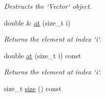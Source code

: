 \begin{DoxyCompactItemize}
\begin{DoxyCompactList}\small\item\em Destructs the `Vector` object. \item\end{DoxyCompactList}\item 
double \& \hyperlink{classcs1730_1_1Vector_ac6a29c2fc7cf67d333483ba396b96323}{at} (size\_\-t i)
\begin{DoxyCompactList}\small\item\em Returns the element at index `i`. \item\end{DoxyCompactList}\item 
double \hyperlink{classcs1730_1_1Vector_a1191a55feadaff0f2e31e504182790c0}{at} (size\_\-t i) const 
\begin{DoxyCompactList}\small\item\em Returns the element at index `i`. \item\end{DoxyCompactList}\item 
\hypertarget{classcs1730_1_1Vector_a316edd0365ccd2adeedb5d177d274305}{
size\_\-t \hyperlink{classcs1730_1_1Vector_a316edd0365ccd2adeedb5d177d274305}{size} () const }
\label{classcs1730_1_1Vector_a316edd0365ccd2adeedb5d177d274305}


\end{DoxyCompactItemize}
